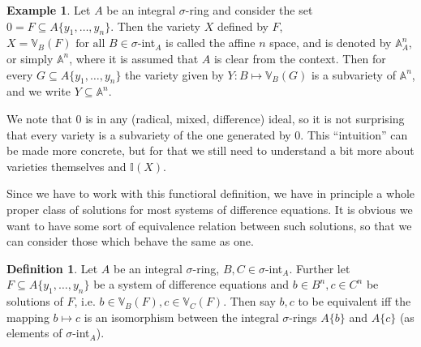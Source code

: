 \documentclass{article}
\def\I{\mathbb{I}}
\def\VV{\mathbb{V}}
\def\s{\sigma}
\def\fa{\text{ for all }}
\theoremstyle{definition}
\newtheorem{ex}[Satz]{Example}
\newtheorem{defn}[Satz]{Definition}
\newtheorem{lem}[Satz]{Lemma}
\begin{document}
\begin{ex}\label{A^n}
Let $A$ be an integral $\s$-ring and consider the set $0 = F \subseteq A\{y_1,\ldots,y_n\}$. Then the variety $X$ defined by $F$, $X = \VV_B(F) \fa B \in \s$-int$_A$ is called the affine $n$ space, and is denoted by $\mathbb{A}^n_A$, 
or simply $\mathbb{A}^n$, where it is assumed that $A$ is clear from the context. Then for every $G \subseteq A\{y_1,\ldots,y_n\}$ the variety given by $Y: B \mapsto \VV_B(G)$ is a subvariety of $\mathbb{A}^n$, 
and we write $Y \subseteq \mathbb{A}^n$.
\end{ex}

We note that $0$ is in any (radical, mixed, difference) ideal, so it is not surprising that every variety is a subvariety of the one generated by $0$. This ``intuition'' can be made more concrete, 
but for that we still need to understand a bit more about varieties themselves and $\I(X)$. 

Since we have to work with this functioral definition, we have in principle a whole proper class of solutions for most systems of difference equations. 
It is obvious we want to have some sort of equivalence relation between such solutions, so that we can consider those which behave the same as one.

\begin{defn}\label{equivsols}
Let $A$ be an integral $\s$-ring, $B,C \in \s$-int$_A$. Further let $F \subseteq A\{y_1,\ldots,y_n\}$ be a system of difference equations and $b \in B^n, c \in C^n$ be solutions of $F$, i.e. $b \in \VV_B(F), c \in \VV_C(F)$.
Then say $b,c$ to be equivalent iff the mapping $b \mapsto c$ is an isomorphism between the integral $\s$-rings $A\{b\}$ and $A\{c\}$  (as elements of $\s$-int$_A$). 
\end{defn}

\end{document}
